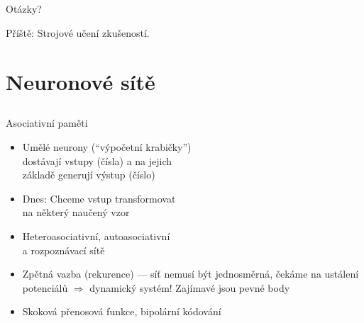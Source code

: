 \documentclass{beamer}
\begin{document}
\subsection{}
\begin{frame}{Otázky?}
\begin{center}
Příště: Strojové učení zkušeností.
\end{center}
\end{frame}

\section{Neuronové sítě}

\subsection{}
\begin{frame}{Asociativní paměti}
\begin{itemize}
\item Umělé neurony (``výpočetní krabičky'') \\ dostávají vstupy (čísla) a na jejich \\ základě generují výstup (číslo)
\item Dnes: Chceme vstup transformovat \\ na některý naučený vzor
\item Heteroasociativní, autoasociativní \\ a rozpoznávací sítě
\item Zpětná vazba (rekurence) --- síť nemusí být jednosměrná,
	čekáme na ustálení potenciálů $\Rightarrow$ dynamický systém!
	Zajímavé jsou pevné body
\item Skoková přenosová funkce, bipolární kódování
\end{itemize}
\end{frame}
\end{document}

